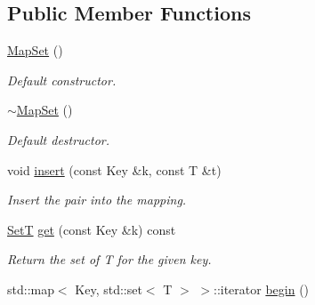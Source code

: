 \subsection*{Public Member Functions}
\begin{DoxyCompactItemize}
\item 
\mbox{\label{classilang_1_1_map_set_afbf388aabd9c3cac2ef0c17790265caf}} 
\mbox{\hyperlink{classilang_1_1_map_set_afbf388aabd9c3cac2ef0c17790265caf}{Map\+Set}} ()
\begin{DoxyCompactList}\small\item\em Default constructor. \end{DoxyCompactList}\item 
\mbox{\label{classilang_1_1_map_set_ad4d2ea683e541ee1608f4b9c5a62ff59}} 
\mbox{\hyperlink{classilang_1_1_map_set_ad4d2ea683e541ee1608f4b9c5a62ff59}{$\sim$\+Map\+Set}} ()
\begin{DoxyCompactList}\small\item\em Default destructor. \end{DoxyCompactList}\item 
\mbox{\label{classilang_1_1_map_set_a4db9ec5eb5c82a8f309799a0483464ca}} 
void \mbox{\hyperlink{classilang_1_1_map_set_a4db9ec5eb5c82a8f309799a0483464ca}{insert}} (const Key \&k, const T \&t)
\begin{DoxyCompactList}\small\item\em Insert the pair into the mapping. \end{DoxyCompactList}\item 
\mbox{\label{classilang_1_1_map_set_ac4358126c0dbc5275e003e38d67f7634}} 
\mbox{\hyperlink{classilang_1_1_map_set_aeefa483aff031c9185145739fef0f6e7}{SetT}} \mbox{\hyperlink{classilang_1_1_map_set_ac4358126c0dbc5275e003e38d67f7634}{get}} (const Key \&k) const
\begin{DoxyCompactList}\small\item\em Return the set of T for the given key. \end{DoxyCompactList}\item 
\mbox{\label{classilang_1_1_map_set_a030e45922bab62a8b47538e3d1d39449}} 
std\+::map$<$ Key, std\+::set$<$ T $>$ $>$\+::iterator \mbox{\hyperlink{classilang_1_1_map_set_a030e45922bab62a8b47538e3d1d39449}{begin}} ()

\end{DoxyCompactItemize}
